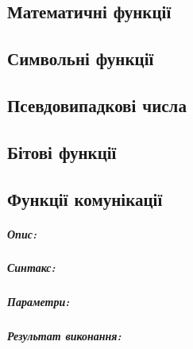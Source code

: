 \documentclass[12pt,a4paper]{report}  %
\begin{document}
\subsection{Математичні функції}
\subsection{Символьні функції}
\subsection{Псевдовипадкові числа}
\subsection{Бітові функції}
\subsection{Функції комунікації}


\subparagraph{Опис:}
\subparagraph{Синтакс:}
\subparagraph{Параметри:}
\subparagraph{Результат виконання:}
\end{document}
